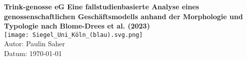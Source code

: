 \begin{titlepage}
\centering
\vspace*{1cm}


{\LARGE\bfseries Trink-genosse eG Eine fallstudienbasierte Analyse eines genossenschaftlichen Geschäftsmodells anhand der Morphologie und Typologie nach Blome-Drees et al. (2023)}\\[1cm]
\texttt{[image: Siegel\_Uni\_Köln\_(blau).svg.png]}\\[2cm]
{\large Autor: Paulin Saher}\\[1cm]
{\large Datum: \today}
\end{titlepage}
